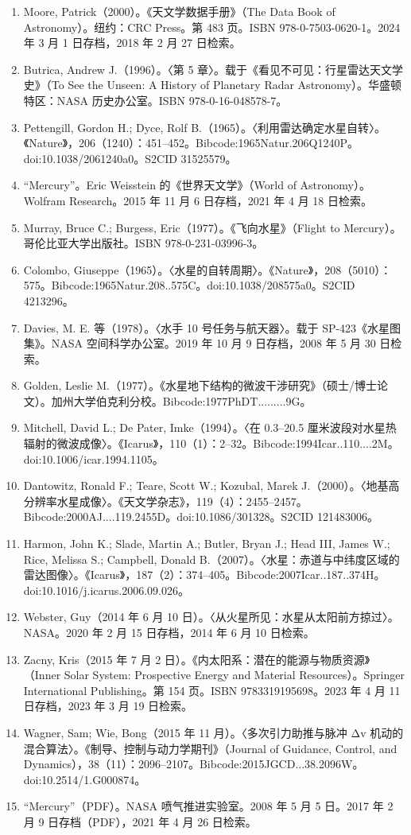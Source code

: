 \begin{enumerate}
    \item Moore, Patrick（2000）。《天文学数据手册》（The Data Book of Astronomy）。纽约：CRC Press。第 483 页。ISBN 978-0-7503-0620-1。2024 年 3 月 1 日存档，2018 年 2 月 27 日检索。
    \item Butrica, Andrew J.（1996）。〈第 5 章〉。载于《看见不可见：行星雷达天文学史》（To See the Unseen: A History of Planetary Radar Astronomy）。华盛顿特区：NASA 历史办公室。ISBN 978-0-16-048578-7。
    \item Pettengill, Gordon H.; Dyce, Rolf B.（1965）。〈利用雷达确定水星自转〉。《Nature》，206（1240）：451–452。Bibcode:1965Natur.206Q1240P。doi:10.1038/2061240a0。S2CID 31525579。
    \item “Mercury”。Eric Weisstein 的《世界天文学》（World of Astronomy）。Wolfram Research。2015 年 11 月 6 日存档，2021 年 4 月 18 日检索。
    \item Murray, Bruce C.; Burgess, Eric（1977）。《飞向水星》（Flight to Mercury）。哥伦比亚大学出版社。ISBN 978-0-231-03996-3。
    \item Colombo, Giuseppe（1965）。〈水星的自转周期〉。《Nature》，208（5010）：575。Bibcode:1965Natur.208..575C。doi:10.1038/208575a0。S2CID 4213296。
    \item Davies, M. E. 等（1978）。〈水手 10 号任务与航天器〉。载于 SP-423《水星图集》。NASA 空间科学办公室。2019 年 10 月 9 日存档，2008 年 5 月 30 日检索。
    \item Golden, Leslie M.（1977）。《水星地下结构的微波干涉研究》（硕士/博士论文）。加州大学伯克利分校。Bibcode:1977PhDT.........9G。
    \item Mitchell, David L.; De Pater, Imke（1994）。〈在 0.3–20.5 厘米波段对水星热辐射的微波成像〉。《Icarus》，110（1）：2–32。Bibcode:1994Icar..110....2M。doi:10.1006/icar.1994.1105。
    \item Dantowitz, Ronald F.; Teare, Scott W.; Kozubal, Marek J.（2000）。〈地基高分辨率水星成像〉。《天文学杂志》，119（4）：2455–2457。Bibcode:2000AJ....119.2455D。doi:10.1086/301328。S2CID 121483006。
    \item Harmon, John K.; Slade, Martin A.; Butler, Bryan J.; Head III, James W.; Rice, Melissa S.; Campbell, Donald B.（2007）。〈水星：赤道与中纬度区域的雷达图像〉。《Icarus》，187（2）：374–405。Bibcode:2007Icar..187..374H。doi:10.1016/j.icarus.2006.09.026。
    \item Webster, Guy（2014 年 6 月 10 日）。〈从火星所见：水星从太阳前方掠过〉。NASA。2020 年 2 月 15 日存档，2014 年 6 月 10 日检索。
    \item Zacny, Kris（2015 年 7 月 2 日）。《内太阳系：潜在的能源与物质资源》（Inner Solar System: Prospective Energy and Material Resources）。Springer International Publishing。第 154 页。ISBN 9783319195698。2023 年 4 月 11 日存档，2023 年 3 月 19 日检索。
    \item Wagner, Sam; Wie, Bong（2015 年 11 月）。〈多次引力助推与脉冲 Δv 机动的混合算法〉。《制导、控制与动力学期刊》（Journal of Guidance, Control, and Dynamics），38（11）：2096–2107。Bibcode:2015JGCD...38.2096W。doi:10.2514/1.G000874。
    \item “Mercury”（PDF）。NASA 喷气推进实验室。2008 年 5 月 5 日。2017 年 2 月 9 日存档（PDF），2021 年 4 月 26 日检索。


\end{enumerate}
